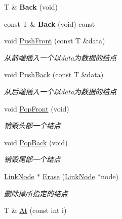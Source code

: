 \begin{DoxyCompactItemize}
\item 
\hypertarget{class_util_1_1_link_list_t_a50a6be84ff3763b8905065dd0b4ea3d2}{T \& {\bfseries Back} (void)}\label{class_util_1_1_link_list_t_a50a6be84ff3763b8905065dd0b4ea3d2}

\item 
\hypertarget{class_util_1_1_link_list_t_a1e84d4db095eea6176e69033fec1b7f1}{const T \& {\bfseries Back} (void) const }\label{class_util_1_1_link_list_t_a1e84d4db095eea6176e69033fec1b7f1}

\item 
void \hyperlink{class_util_1_1_link_list_t_a23cd50293429437d6b3695bad16ce846}{Push\-Front} (const T \&data)
\begin{DoxyCompactList}\small\item\em 从前端插入一个以data为数据的结点 \end{DoxyCompactList}\item 
void \hyperlink{class_util_1_1_link_list_t_a3bbe08d8e419e3fc7ce714994a0f7505}{Push\-Back} (const T \&data)
\begin{DoxyCompactList}\small\item\em 从后端插入一个以data为数据的结点 \end{DoxyCompactList}\item 
\hypertarget{class_util_1_1_link_list_t_a035b833be025ca3c1dbf9e1e740ffaeb}{void \hyperlink{class_util_1_1_link_list_t_a035b833be025ca3c1dbf9e1e740ffaeb}{Pop\-Front} (void)}\label{class_util_1_1_link_list_t_a035b833be025ca3c1dbf9e1e740ffaeb}

\begin{DoxyCompactList}\small\item\em 销毁头部一个结点 \end{DoxyCompactList}\item 
\hypertarget{class_util_1_1_link_list_t_ad7bba2fe869cd01bae4ea14e3af31d7e}{void \hyperlink{class_util_1_1_link_list_t_ad7bba2fe869cd01bae4ea14e3af31d7e}{Pop\-Back} (void)}\label{class_util_1_1_link_list_t_ad7bba2fe869cd01bae4ea14e3af31d7e}

\begin{DoxyCompactList}\small\item\em 销毁尾部一个结点 \end{DoxyCompactList}\item 
\hyperlink{class_util_1_1_link_list_t_1_1_link_node}{Link\-Node} $\ast$ \hyperlink{class_util_1_1_link_list_t_a7a37440fafe515f7d4a41f1092455a5c}{Erase} (\hyperlink{class_util_1_1_link_list_t_1_1_link_node}{Link\-Node} $\ast$node)
\begin{DoxyCompactList}\small\item\em 删除掉所指定的结点 \end{DoxyCompactList}\item 
\hypertarget{class_util_1_1_link_list_t_ad9defc05d4cc572f91d3dcc901670987}{T \& \hyperlink{class_util_1_1_link_list_t_ad9defc05d4cc572f91d3dcc901670987}{At} (const int i)}\label{class_util_1_1_link_list_t_ad9defc05d4cc572f91d3dcc901670987}


\end{DoxyCompactItemize}
